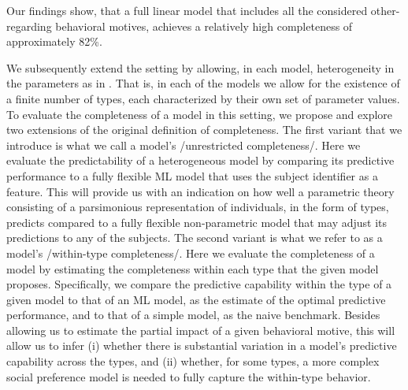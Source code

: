 \documentclass[letterpaper,11pt,leqno]{article}
\begin{document}
Our findings show, that a full linear model that includes all the considered other-regarding behavioral motives, achieves a relatively high completeness of approximately 82\%.

We subsequently extend the setting by allowing, in each model, heterogeneity in the parameters as in \cite{Bruhin2019}. That is, in each of the models we allow for the existence of a finite number of types, each characterized by their own set of parameter values. To evaluate the completeness of a model in this setting, we propose and explore two extensions of the original definition of completeness. The first variant that we introduce is what we call a model's /unrestricted completeness/. Here we evaluate the predictability of a heterogeneous model by comparing its predictive performance to a fully flexible ML model that uses the subject identifier as a feature. This will provide us with an indication on how well a parametric theory consisting of a parsimonious representation of individuals, in the form of types, predicts compared to a fully flexible non-parametric model that may adjust its predictions to any of the subjects. The second variant is what we refer to as a model's /within-type completeness/. Here we evaluate the completeness of a model by estimating the completeness within each type that the given model proposes. Specifically, we compare the predictive capability within the type of a given model to that of an ML model, as the estimate of the optimal predictive performance, and to that of a simple model, as the naive benchmark. Besides allowing us to estimate the partial impact of a given behavioral motive, this will allow us to infer (i) whether there is substantial variation in a model's predictive capability across the types, and (ii) whether, for some types, a more complex social preference model is needed to fully capture the within-type behavior.
\end{document}
